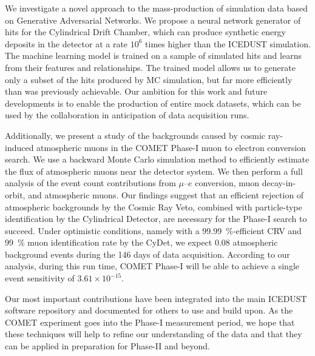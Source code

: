 We investigate a novel approach to the mass-production of simulation data based
on Generative Adversarial Networks. We propose a neural network generator of
hits for the Cylindrical Drift Chamber, which can produce synthetic energy
deposits in the detector at a rate $10^6$ times higher than the ICEDUST
simulation. The machine learning model is trained on a sample of simulated hits
and learns from their features and relationships. The trained model allows us to
generate only a subset of the hits produced by MC simulation, but far more
efficiently than was previously achievable. Our ambition for this work and
future developments is to enable the production of entire mock datasets, which
can be used by the collaboration in anticipation of data acquisition runs.

Additionally, we present a study of the backgrounds caused by cosmic ray-induced
atmospheric muons in the COMET Phase-I muon to electron conversion search. We
use a backward Monte Carlo simulation method to efficiently estimate the flux of
atmospheric muons near the detector system. We then perform a full analysis of
the event count contributions from $\mu$--$e$ conversion, muon decay-in-orbit,
and atmospheric muons. Our findings suggest that an efficient rejection of
atmospheric backgrounds by the Cosmic Ray Veto, combined with particle-type
identification by the Cylindrical Detector, are necessary for the Phase-I search
to succeed. Under optimistic conditions, namely with a
\SI{99.99}{\percent}-efficient CRV and \SI{99}{\percent} muon identification
rate by the CyDet, we expect 0.08 atmospheric background events during the 146
days of data acquisition. According to our analysis, during this run time, COMET
Phase-I will be able to achieve a single event sensitivity of $3.61 \times
10^{-15}$.


Our most important contributions have been integrated into the main ICEDUST
software repository and documented for others to use and build upon. As the
COMET experiment goes into the Phase-I measurement period, we hope that these
techniques will help to refine our understanding of the data and that they can
be applied in preparation for Phase-II and beyond.